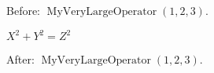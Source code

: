 \documentclass{article}
\DeclareMathOperator{\MyOp}{MyVeryLargeOperator}
\begin{document}
Before: $\MyOp(1,2,3)$. %

{\lsstyle $X^2 + Y^2 = Z^2$} %

After: $\MyOp(1,2,3)$. %
\end{document}
